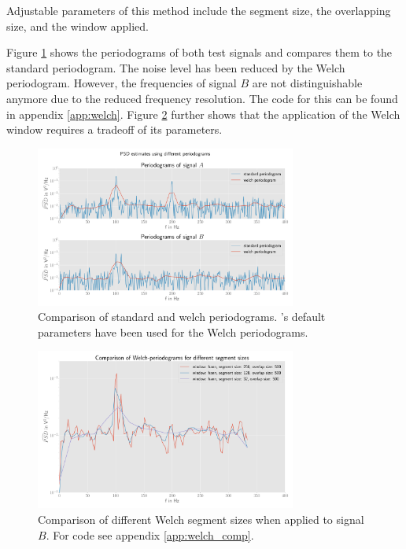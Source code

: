 Adjustable parameters of this method include the segment size, the overlapping size, and the window applied.

Figure \ref{fig:welch_exp} shows the periodograms of both test signals and compares them to the standard periodogram. The noise level has been reduced by the Welch periodogram. However, the frequencies of signal $B$ are not distinguishable anymore due to the reduced frequency resolution. The code for this can be found in appendix \ref{app:welch}. Figure \ref{fig:welch_comp} further shows that the application of the Welch window requires a tradeoff of its parameters.

\begin{figure}[h]
\centering
\includegraphics[width=0.764\textwidth]{graphics/welch.pdf}
\caption{Comparison of standard and welch periodograms. 's default parameters have been used for the Welch periodograms.}\label{fig:welch_exp}
\end{figure}


\begin{figure}[H]
\centering
\includegraphics[width=0.764\textwidth]{graphics/welch_comp.pdf}
\caption{Comparison of different Welch segment sizes when applied to signal $B$. For code see appendix \ref{app:welch_comp}.}\label{fig:welch_comp}
\end{figure}
